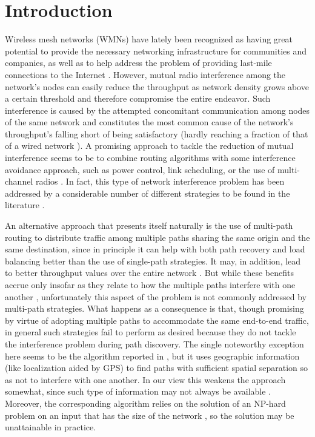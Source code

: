 \documentclass{article}
\begin{document}
\newpage
\section{Introduction}\label{sec:intro}

Wireless mesh networks (WMNs) have lately been recognized as having great
potential to provide the necessary networking infrastructure for communities and
companies, as well as to help address the problem of providing last-mile
connections to the Internet \cite{Nandiraju2007,Siekkinen2007}. However, mutual
radio interference among the network's nodes can easily reduce the throughput as
network density grows above a certain threshold \cite{Balachandran2005} and
therefore compromise the entire endeavor. Such interference is caused by the
attempted concomitant communication among nodes of the same network and
constitutes the most common cause of the network's throughput's falling short of
being satisfactory (hardly reaching a fraction of that of a wired network
\cite{Gupta2000}). A promising approach to tackle the reduction of mutual
interference seems to be to combine routing algorithms with some interference
avoidance approach, such as power control, link scheduling, or the use of
multi-channel radios \cite{Akyildiz2005}. In fact, this type of network
interference problem has been addressed by a considerable number of different
strategies to be found in the literature
\cite{Ying2000,Cruz2003,Abolhasan2004,Sheriff2006,Campista2008,Wang2008,Srikanth2010,Augusto2011}.

An alternative approach that presents itself naturally is the use of multi-path
routing to distribute traffic among multiple paths sharing the same origin and
the same destination, since in principle it can help with both path recovery and
load balancing better than the use of single-path strategies. It may, in
addition, lead to better throughput values over the entire network
\cite{Salma2006,Augusto2010}. But while these benefits accrue only insofar as
they relate to how the multiple paths interfere with one another
\cite{Tsai2006,Tarique2009}, unfortunately this aspect of the problem is not
commonly addressed by multi-path strategies. What happens as a consequence is
that, though promising by virtue of adopting multiple paths to accommodate the
same end-to-end traffic, in general such strategies fail to perform as desired
because they do not tackle the interference problem during path discovery. The
single noteworthy exception here seems to be the algorithm reported in
\cite{Waharte2006}, but it uses geographic information (like localization aided
by GPS) to find paths with sufficient spatial separation so as not to interfere
with one another. In our view this weakens the approach somewhat, since such
type of information may not always be available \cite{Demirkol2006}. Moreover,
the corresponding algorithm relies on the solution of an NP-hard problem on an
input that has the size of the network \cite{Waharte2008}, so the solution may
be unattainable in practice.
\end{document}
